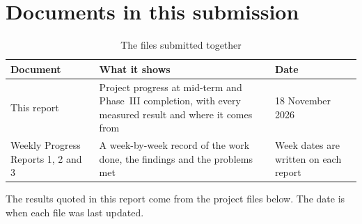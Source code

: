 \documentclass[12pt,a4paper]{report}
\newcommand{\tabfont}{\small}
\begin{document}
\section*{Documents in this submission}

\begin{table}[H]
\centering
\caption{The files submitted together}
\label{tab:documents}
\tabfont
\begin{tabularx}{\textwidth}{@{}p{4.1cm}Yp{3.3cm}@{}}
\toprule
\textbf{Document} & \textbf{What it shows} & \textbf{Date} \\
\midrule
This report & Project progress at mid-term and Phase~III completion, with every measured result and where it comes from & 18 November 2026 \\
Weekly Progress Reports 1, 2 and 3 & A week-by-week record of the work done, the findings and the problems met & Week dates are written on each report \\
\bottomrule
\end{tabularx}
\end{table}

The results quoted in this report come from the project files below. The date is when
each file was last updated.
\end{document}
